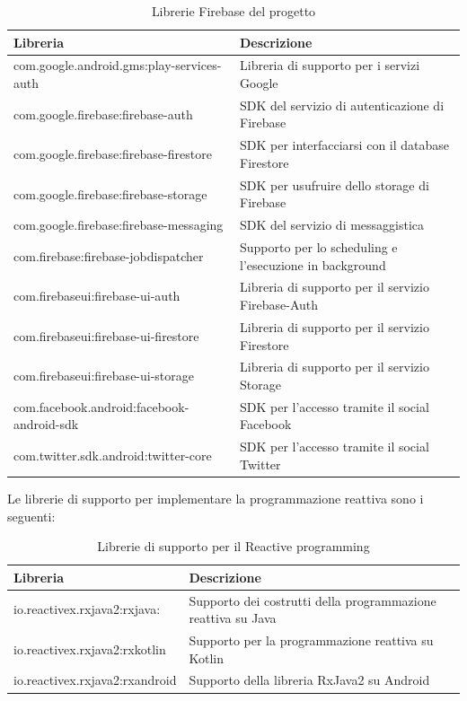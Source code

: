 \begin{table}[!h]
\begin{center}
\begin{tabular}{|l|p{7cm}|}
    \hline
\textbf{Libreria} & \textbf{Descrizione}\\ \hline
com.google.android.gms:play-services-auth  & Libreria di supporto per i servizi Google  \\ \hline
com.google.firebase:firebase-auth & SDK del servizio di autenticazione di Firebase \\ \hline
com.google.firebase:firebase-firestore & SDK per interfacciarsi con il database Firestore \\ \hline
com.google.firebase:firebase-storage & SDK per usufruire dello storage di Firebase  \\ \hline
com.google.firebase:firebase-messaging & SDK del servizio di messaggistica \\ \hline
com.firebase:firebase-jobdispatcher  & Supporto per lo scheduling e l'esecuzione in background\\ \hline
com.firebaseui:firebase-ui-auth & Libreria di supporto per il servizio Firebase-Auth  \\ \hline
com.firebaseui:firebase-ui-firestore & Libreria di supporto per il servizio Firestore  \\ \hline
com.firebaseui:firebase-ui-storage & Libreria di supporto per il servizio Storage  \\ \hline
com.facebook.android:facebook-android-sdk & SDK per l'accesso tramite il social Facebook \\ \hline
com.twitter.sdk.android:twitter-core & SDK per l'accesso tramite il social Twitter \\ \hline
\end{tabular}
\caption[Librerie Firebase del progetto]{Librerie Firebase del progetto}\label{tab:Librerie Firebase del progetto}
\end{center}
\end{table}

\newpage


Le librerie di supporto per implementare la programmazione reattiva sono i seguenti:


\begin{table}[!h]
\begin{center}
\begin{tabular}{|l|p{8cm}|}
    \hline
\textbf{Libreria} & \textbf{Descrizione}\\ \hline
io.reactivex.rxjava2:rxjava:& Supporto dei costrutti della programmazione reattiva su Java  \\ \hline
io.reactivex.rxjava2:rxkotlin & Supporto per la programmazione reattiva su Kotlin  \\ \hline
io.reactivex.rxjava2:rxandroid & Supporto della libreria RxJava2 su Android  \\ \hline
\end{tabular}
\caption[Librerie di supporto per il Reactive programming]{Librerie di supporto per il Reactive programming}\label{tab:Librerie di supporto per il Reactive programming}
\end{center}
\end{table}

